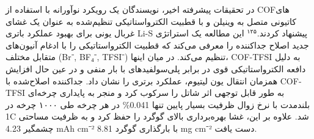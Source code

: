 \documentclass[12pt,a4paper,twocolumn]{article} %
\newcommand{\persian}[1]{\textfarsi{#1}}
\newcommand{\english}[1]{\textenglish{#1}}
\begin{document}
\persian{
در تحقیقات پیشرفته اخیر، نویسندگان یک رویکرد نوآورانه با استفاده از \english{COF}های کاتیونی متصل به وینیلن و با قطبیت الکترواستاتیکی تنظیم‌شده به عنوان یک غشای غربال یونی برای بهبود عملکرد باتری \english{Li-S} پیشنهاد کردند.$^{۱۲۵}$ این مطالعه یک استراتژی جدید اصلاح جداکننده را معرفی می‌کند که قطبیت الکترواستاتیکی را با ادغام آنیون‌های متقابل مختلف (\english{Br⁻, BF₄⁻, TFSI⁻}) تنظیم می‌کند. در میان اینها، \english{COF-TFSI} به دلیل دافعه الکترواستاتیکی قوی در برابر پلی‌سولفیدهای با بار منفی و در عین حال افزایش همزمان انتقال یون لیتیوم، عملکرد برتری را نشان داد. جداکننده اصلاح‌شده با \english{COF-TFSI} به طور قابل توجهی اثر شاتل را سرکوب کرد و منجر به پایداری چرخه‌ای بلندمدت با نرخ زوال ظرفیت بسیار پایین تنها \english{0.041\%} در هر چرخه طی ۱۰۰۰ چرخه در \english{1C} شد. علاوه بر این، غشا بهره‌برداری بالای گوگرد را حفظ کرد و به ظرفیت مساحتی چشمگیر \english{4.23 mAh cm⁻²} با بارگذاری گوگرد \english{8.81 mg cm⁻²} دست یافت.
}

\end{document}
